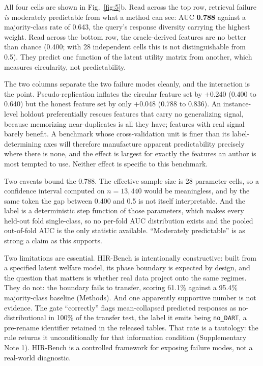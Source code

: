 \documentclass[11pt,letterpaper]{article}
\begin{document}
All four cells are shown in Fig.~\ref{fig:5}b. Read across the top row, retrieval failure
\emph{is} moderately predictable from what a method can see: AUC \textbf{0.788} against a
majority-class rate of 0.643, the query's response diversity carrying the highest weight. Read
across the bottom row, the oracle-derived features are no better than chance (0.400;
with 28 independent cells this is not distinguishable from 0.5). They predict one function of the
latent utility matrix from another, which measures circularity, not predictability.

The two columns separate the two failure modes cleanly, and the interaction is the point.
Pseudo-replication inflates the circular feature set by $+$0.240 (0.400 to 0.640)
but the honest feature set by only $+$0.048 (0.788 to 0.836). An instance-level
holdout preferentially rescues features that carry no generalizing signal, because
memorizing near-duplicates is all they have; features with real signal barely benefit.
A benchmark whose cross-validation unit is finer than its label-determining axes will
therefore manufacture apparent predictability precisely where there is none, and the effect
is largest for exactly the features an author is most tempted to use. Neither effect is
specific to this benchmark.

Two caveats bound the 0.788. The
effective sample size is 28 parameter cells, so a confidence interval computed on
$n = 13{,}440$ would be meaningless, and by the same token the gap between 0.400 and 0.5 is
not itself interpretable. And the label is a deterministic step function of those
parameters, which makes every held-out fold single-class, so no per-fold AUC distribution
exists and the pooled out-of-fold AUC is the only statistic available. ``Moderately
predictable'' is as strong a claim as this supports.

Two limitations are essential. HIR-Bench is intentionally constructive: built from a specified
latent welfare model, its phase boundary is expected by design, and the question that
matters is whether real data project onto the same regimes. They do not: the boundary fails to
transfer, scoring 61.1\% against a 95.4\% majority-class baseline (Methods). And one apparently
supportive number is not evidence. The gate ``correctly'' flags mean-collapsed predicted responses
as no-distributional in 100\% of the transfer test, the label it emits being \texttt{no\_DART}, a
pre-rename identifier retained in the released tables. That rate is a tautology: the rule returns
it unconditionally for that information condition (Supplementary Note 1). HIR-Bench is
a controlled framework for exposing failure modes, not a real-world diagnostic.
\end{document}
